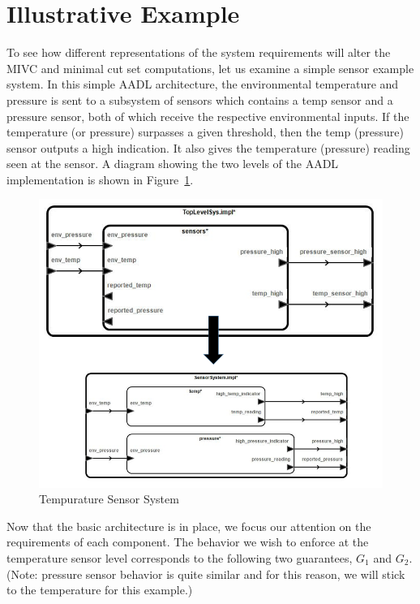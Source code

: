 \section{Illustrative Example}
\label{sec:granularityEx}
To see how different representations of the system requirements will alter the MIVC and minimal cut set computations, let us examine a simple sensor example system. In this simple AADL architecture, the environmental temperature and pressure is sent to a subsystem of sensors which contains a temp sensor and a pressure sensor, both of which receive the respective environmental inputs. If the temperature (or pressure) surpasses a given threshold, then the temp (pressure) sensor outputs a high indication. It also gives the temperature (pressure) reading seen at the sensor. A diagram showing the two levels of the AADL implementation is shown in Figure~\ref{fig:sensorGran1}.  

\begin{figure}[h]
\begin{center}
\includegraphics[width=14cm]{images/sensorGran.png}
\caption{Tempurature Sensor System} 
\label{fig:sensorGran1}
\end{center}
\end{figure}

Now that the basic architecture is in place, we focus our attention on the requirements of each component. The behavior we wish to enforce at the temperature sensor level corresponds to the following two guarantees, $G_1$ and $G_2$. (Note: pressure sensor behavior is quite similar and for this reason, we will stick to the temperature for this example.) 

